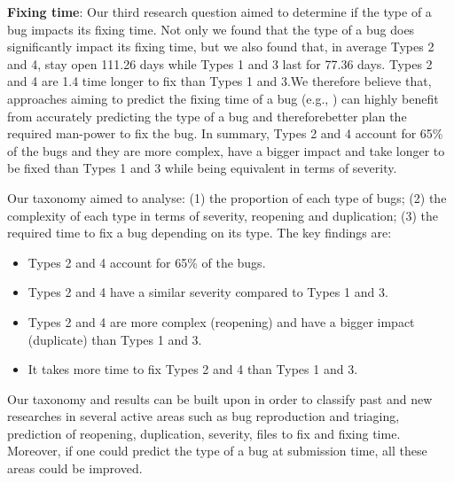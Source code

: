 {\bf Fixing time}: Our third research question aimed to determine
if the type of a bug impacts its fixing time. Not only we found
that the type of a bug does significantly impact its fixing time,
but we also found that, in average Types 2 and 4, stay open
111.26 days while Types 1 and 3 last for 77.36 days. Types 2
and 4 are 1.4 time longer to fix than Types 1 and 3.We
therefore believe that, approaches aiming to predict the fixing
time of a bug (e.g., \cite{Panjer2007,Bhattacharya2011,Zhang2013}) can highly benefit from
accurately predicting the type of a bug and thereforebetter
plan the required man-power to fix the bug.
In summary, Types 2 and 4 account for 65\% of the bugs
and they are more complex, have a bigger impact and take
longer to be fixed than Types 1 and 3 while being equivalent
in terms of severity.

Our taxonomy aimed to analyse: (1) the
proportion of each type of bugs; (2) the complexity of each
type in terms of severity, reopening and duplication; (3) the
required time to fix a bug depending on its type. The key
findings are:
\begin{itemize}
  \item Types 2 and 4 account for 65\% of the bugs.
  \item Types 2 and 4 have a similar severity compared to
Types 1 and 3.
  \item Types 2 and 4 are more complex (reopening) and have
a bigger impact (duplicate) than Types 1 and 3.
  \item It takes more time to fix Types 2 and 4 than Types 1
and 3.
\end{itemize}

Our taxonomy and results can be built upon in order to classify
past and new researches in several active areas such as bug
reproduction and triaging, prediction of reopening,
duplication, severity, files to fix and fixing time. Moreover, if
one could predict the type of a bug at submission time, all
these areas could be improved.
